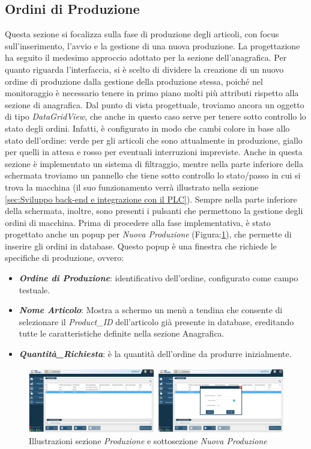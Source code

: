 \subsection{Ordini di Produzione}

Questa sezione si focalizza sulla fase di produzione degli articoli, con focus sull'inserimento, l'avvio e la gestione di una nuova produzione. La progettazione ha seguito il medesimo approccio adottato per la sezione dell'anagrafica. Per quanto riguarda l'interfaccia, si è scelto di dividere la creazione di un nuovo ordine di produzione dalla gestione della produzione stessa, poiché nel monitoraggio è necessario tenere in primo piano molti più attributi rispetto alla sezione di anagrafica. Dal punto di vista progettuale, troviamo ancora un oggetto di tipo \textit{DataGridView}, che anche in questo caso serve per tenere sotto controllo lo stato degli ordini. Infatti, è configurato in modo che cambi colore in base allo stato dell'ordine: verde per gli articoli che sono attualmente in produzione, giallo per quelli in attesa e rosso per eventuali interruzioni impreviste. Anche in questa sezione è implementato un sistema di filtraggio, mentre nella parte inferiore della schermata troviamo un pannello che tiene sotto controllo lo stato/passo in cui si trova la macchina (il suo funzionamento verrà illustrato nella sezione \ref{sec:Sviluppo back-end e integrazione con il PLC}). Sempre nella parte inferiore della schermata, inoltre, sono presenti i pulsanti che permettono la gestione degli ordini di macchina. Prima di procedere alla fase implementativa, è stato progettato anche un popup per \textit{Nuova Produzione} (Figura:\ref{fig:Produzione.png}), che permette di inserire gli ordini in database. Questo popup è una finestra che richiede le specifiche di produzione, ovvero:
\begin{itemize}
    \item \textit{\textbf{Ordine di Produzione}}: identificativo dell'ordine, configurato come campo testuale.
    \item \textit{\textbf{Nome Articolo}}: Mostra a schermo un menù a tendina che consente di selezionare il \textit{Product\_ID} dell'articolo già presente in database, ereditando tutte le caratteristiche definite nella sezione Anagrafica.
    \item \textit{\textbf{Quantità\_Richiesta}}: è la quantità dell'ordine da produrre inizialmente.
\end{itemize}

\begin{figure} 
    \centering
    \includegraphics[width=1\linewidth]{Immagini/Produzione.png}
    \caption{Illustrazioni sezione \textit{Produzione} e sottosezione \textit{Nuova Produzione}}
    \label{fig:Produzione.png}
\end{figure}

